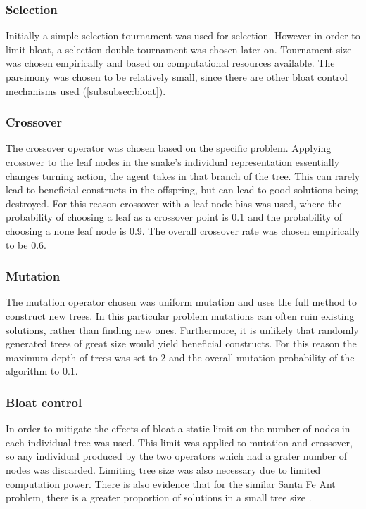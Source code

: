 \documentclass[12pt,a4paper]{article}
\begin{document}
	\subsubsection{Selection}
	Initially a simple selection tournament was used for selection. However in order to limit bloat, a selection double tournament was chosen later on. Tournament size was chosen empirically and based on computational resources available. The parsimony was chosen to be relatively small, since there are other bloat control mechanisms used (\autoref{subsubsec:bloat}).
	
	\subsubsection{Crossover}
	The crossover operator was chosen based on the specific problem. Applying crossover to the leaf nodes in the snake's individual representation essentially changes turning action, the agent takes in that branch of the tree. This can rarely lead to beneficial constructs in the offspring, but can lead to good solutions being destroyed. For this reason crossover with a leaf node bias was used, where the probability of choosing a leaf as a crossover point is 0.1 and the probability of choosing a none leaf node is 0.9. The overall crossover rate was chosen empirically to be 0.6.
		
	\subsubsection{Mutation}
	The mutation operator chosen was uniform mutation and uses the full method to construct new trees. In this particular problem mutations can often ruin existing solutions, rather than finding new ones. Furthermore, it is unlikely that randomly generated  trees of great size would yield beneficial constructs. For this reason the maximum depth of trees was set to 2 and the overall mutation probability of the algorithm to 0.1.  
	
	\subsubsection{Bloat control} \label{subsubsec:bloat}
	In order to mitigate the effects of bloat a static limit on the number of nodes in each individual tree was used. This limit was applied to mutation and crossover, so any individual produced by the two operators which had a grater number of nodes was discarded. Limiting tree size was also necessary due to limited computation power. There is also evidence that for the similar Santa Fe Ant problem, there is a greater proportion of solutions in a small tree size \cite{langdon_why_1998}. 
	
\end{document}
